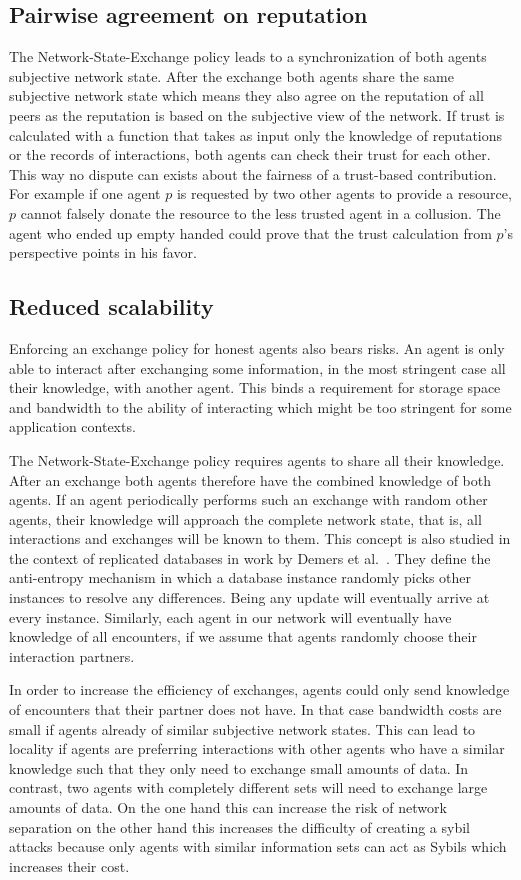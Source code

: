 \subsection{Pairwise agreement on reputation}
The Network-State-Exchange policy leads to a synchronization of both agents subjective network state.
After the exchange both agents share the same subjective network state which means they also agree
on the reputation of all peers as the reputation is based on the subjective view of the network.
If trust is calculated with a function that takes as input only the knowledge of reputations or the
records of interactions, both agents can check their trust for each other. This way no dispute can 
exists about the fairness of a trust-based contribution. For example if one agent $p$ is requested by 
two other agents to provide a resource, $p$ cannot falsely donate the resource to the less 
trusted agent in a collusion. The agent who ended up empty handed could prove that the trust 
calculation from $p$'s perspective points in his favor.

\subsection{Reduced scalability}
\label{sec:storage}
Enforcing an exchange policy for honest agents also bears risks. An agent is only able to interact
after exchanging some information, in the most stringent case all their knowledge, with another agent. 
This binds a requirement for storage space and bandwidth to the ability of interacting which might 
be too stringent for some application contexts. 

The Network-State-Exchange policy requires agents to share all their knowledge. After an exchange 
both agents therefore have the combined knowledge of both agents. If an agent periodically performs such an 
exchange with random other agents, their knowledge will approach the complete network state, that 
is, all interactions and exchanges will be known to them. This concept is also studied in the context
of replicated databases in work by Demers et al.\ \cite{demers1987epidemic}. They define the anti-entropy
mechanism in which a database instance randomly picks other instances to resolve any differences. Being
any update will eventually arrive at every instance. Similarly, each agent in our network will eventually 
have knowledge of all encounters, if we assume that agents randomly choose their interaction partners.

In order to increase the efficiency of exchanges, agents could only send knowledge of encounters 
that their partner does not have. In that case bandwidth costs are small if agents already of similar subjective network states.
This can lead to locality if agents are preferring interactions with other agents who have a similar
knowledge such that they only need to exchange small amounts of data. In contrast, two agents with completely different sets will need to
exchange large amounts of data.
On the one hand this can increase the risk of network separation on the other hand this increases 
the difficulty of creating a sybil attacks because only agents with similar information sets can 
act as Sybils which increases their cost.
